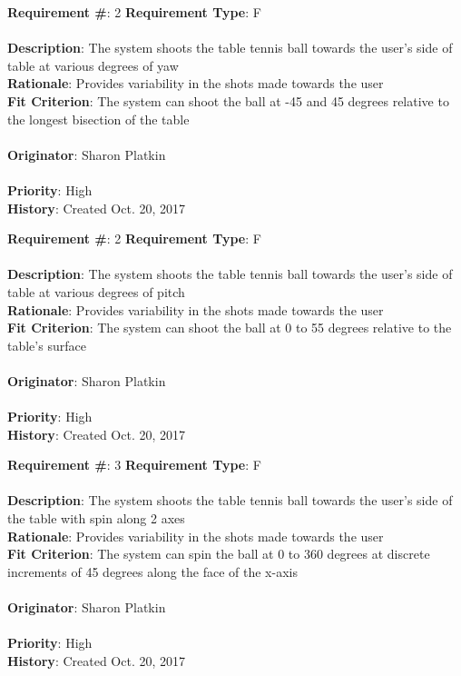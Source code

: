 \documentclass[11pt]{article}
\begin{document}
\begin{framed}
	\noindent\textbf{Requirement \#}: 2 \hfill \textbf{Requirement Type}: F \hfill\\\\
	\noindent\textbf{Description}: The system shoots the table tennis ball towards the user's side of table at various degrees of yaw \\
	\textbf{Rationale}: Provides variability in the shots made towards the user \\
	\textbf{Fit Criterion}: The system can shoot the ball at -45 and 45 degrees relative to the longest bisection of the table\\\\ %
	\textbf{Originator}: Sharon Platkin \\\\
	\textbf{Priority}: High \hfill \\
	\noindent\textbf{History}: Created Oct. 20, 2017
\end{framed}

\begin{framed} %
	\noindent\textbf{Requirement \#}: 2 \hfill \textbf{Requirement Type}: F \hfill\\\\
	\noindent\textbf{Description}: The system shoots the table tennis ball towards the user's side of table at various degrees of pitch \\
	\textbf{Rationale}: Provides variability in the shots made towards the user \\
	\textbf{Fit Criterion}: The system can shoot the ball at 0 to 55 degrees relative to the table's surface\\\\
	\textbf{Originator}: Sharon Platkin \\\\
	\textbf{Priority}: High \hfill \\
	\noindent\textbf{History}: Created Oct. 20, 2017
\end{framed}

\begin{framed} %
	\noindent\textbf{Requirement \#}: 3 \hfill \textbf{Requirement Type}: F \hfill\\\\
	\noindent\textbf{Description}: The system shoots the table tennis ball towards the user's side of the table with spin along 2 axes \\
	\textbf{Rationale}: Provides variability in the shots made towards the user \\
	\textbf{Fit Criterion}: The system can spin the ball at 0 to 360 degrees at discrete increments of 45 degrees along the face of the x-axis \\\\
	\textbf{Originator}: Sharon Platkin \\\\
	\textbf{Priority}: High \hfill \\
	\noindent\textbf{History}: Created Oct. 20, 2017
\end{framed}
\end{document}
